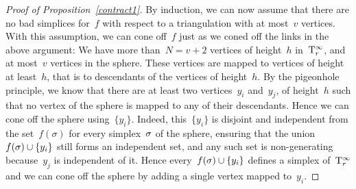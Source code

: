 \begin{proof}[Proof of Proposition~\ref{contract1}]
By induction, we can now assume that there are no bad simplices for~$f$ with respect to a triangulation with at most~$v$ vertices. With this assumption, we can 
cone off~$f$ just as we coned off the links in the above argument:  We have more than~$N=v+2$ vertices of height~$h$ in~$\mathrm{T}_r^\infty$, and at most~$v$ vertices in the sphere. These vertices are mapped to vertices of height at least~$h$, that is to descendants of the vertices of height~$h$. By the pigeonhole principle, we know that there are at least two vertices~$y_i$ and~$y_j$, of height~$h$ such that no vertex of the sphere is mapped to any of their descendants. Hence we can cone off the sphere using~$\{y_i\}$. Indeed, this~$\{y_i\}$ is disjoint and independent from the set~$f(\sigma)$ for every simplex~$\sigma$ of the sphere, ensuring that the union~$f(\sigma)\cup\{y_i\}$ still forms an independent set, and any such set is non-generating because~$y_j$ is independent of it. Hence every~$f(\sigma)\cup\{y_i\}$ defines a simplex of~$\mathrm{T}_r^\infty$ and we can cone off the sphere by adding a single vertex mapped to~$y_i$. 
\end{proof}


